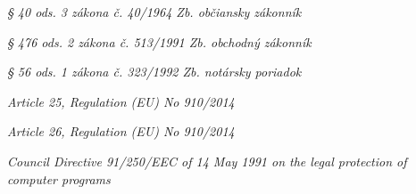 \documentclass[thesismargins, english, thesislinespacing, twoside, openright, upjsfrontpage]{rnthesis}
\begin{document}
\begin{thebibliography}{9}

  \emph{§ 40 ods. 3 zákona č. 40/1964 Zb. občiansky zákonník}

  \emph{§ 476 ods. 2 zákona č. 513/1991 Zb. obchodný zákonník}

  \emph{§ 56 ods. 1 zákona č. 323/1992 Zb. notársky poriadok}

  \emph{Article 25, Regulation (EU) No 910/2014}

  \emph{Article 26, Regulation (EU) No 910/2014}

  \emph{Council Directive 91/250/EEC of 14 May 1991 on the legal protection of computer programs}


\end{thebibliography}
\end{document}
